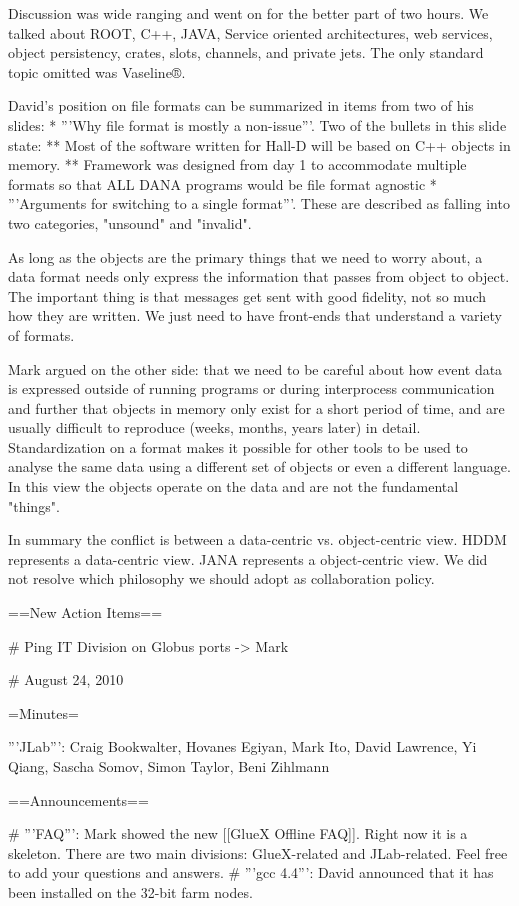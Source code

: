 Discussion was wide ranging and went on for the better part of two hours. We talked about ROOT, C++, JAVA, Service oriented architectures, web services, object persistency, crates, slots, channels, and private jets. The only standard topic omitted was Vaseline®.

David's position on file formats can be summarized in items from two of his slides:
* '''Why file format is mostly a non-issue'''. Two of the bullets in this slide state:
** Most of the software written for Hall-D will be based on C++ objects in memory.
** Framework was designed from day 1 to accommodate multiple formats so that ALL DANA programs would be file format agnostic
* '''Arguments for switching to a single format'''. These are described as falling into two categories, "unsound" and "invalid".

As long as the objects are the primary things that we need to worry about, a data format needs only express the information that passes from object to object. The important thing is that messages get sent with good fidelity, not so much how they are written. We just need to have front-ends that understand a variety of formats.

Mark argued on the other side: that we need to be careful about how event data is expressed outside of running programs or during interprocess communication and further that objects in memory only exist for a short period of time, and are usually difficult to reproduce (weeks, months, years later) in detail. Standardization on a format makes it possible for other tools to be used to analyse the same data using a different set of objects or even a different language. In this view the objects operate on the data and are not the fundamental "things".

In summary the conflict is between a data-centric vs. object-centric view. HDDM represents a data-centric view. JANA represents a object-centric view. We did not resolve which philosophy we should adopt as collaboration policy.

==New Action Items==

# Ping IT Division on Globus ports -> Mark


# August 24, 2010

=Minutes=

'''JLab''': Craig Bookwalter, Hovanes Egiyan, Mark Ito, David Lawrence, Yi Qiang, Sascha Somov, Simon Taylor, Beni Zihlmann

==Announcements==

# '''FAQ''': Mark showed the new [[GlueX Offline FAQ]]. Right now it is a skeleton. There are two main divisions: GlueX-related and JLab-related. Feel free to add your questions and answers.
# '''gcc 4.4''': David announced that it has been installed on the 32-bit farm nodes.

